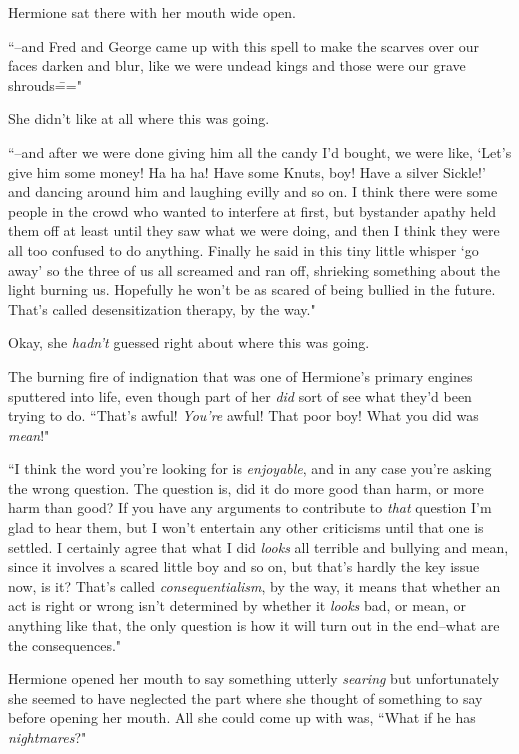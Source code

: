 Hermione sat there with her mouth wide open.

``\---and Fred and George came up with this spell to make the scarves over our faces darken and blur, like we were undead kings and those were our grave shrouds\==="

She didn't like at all where this was going.

``\---and after we were done giving him all the candy I'd bought, we were like, `Let's give him some money! Ha ha ha! Have some Knuts, boy! Have a silver Sickle!' and dancing around him and laughing evilly and so on. I think there were some people in the crowd who wanted to interfere at first, but bystander apathy held them off at least until they saw what we were doing, and then I think they were all too confused to do anything. Finally he said in this tiny little whisper `go away' so the three of us all screamed and ran off, shrieking something about the light burning us. Hopefully he won't be as scared of being bullied in the future. That's called desensitization therapy, by the way."

Okay, she \emph{hadn't} guessed right about where this was going.

The burning fire of indignation that was one of Hermione's primary engines sputtered into life, even though part of her \emph{did} sort of see what they'd been trying to do. ``That's awful! \emph{You're} awful! That poor boy! What you did was \emph{mean}!"

``I think the word you're looking for is \emph{enjoyable}, and in any case you're asking the wrong question. The question is, did it do more good than harm, or more harm than good? If you have any arguments to contribute to \emph{that} question I'm glad to hear them, but I won't entertain any other criticisms until that one is settled. I certainly agree that what I did \emph{looks} all terrible and bullying and mean, since it involves a scared little boy and so on, but that's hardly the key issue now, is it? That's called \emph{consequentialism}, by the way, it means that whether an act is right or wrong isn't determined by whether it \emph{looks} bad, or mean, or anything like that, the only question is how it will turn out in the end\---what are the consequences."

Hermione opened her mouth to say something utterly \emph{searing} but unfortunately she seemed to have neglected the part where she thought of something to say before opening her mouth. All she could come up with was, ``What if he has \emph{nightmares}?"

